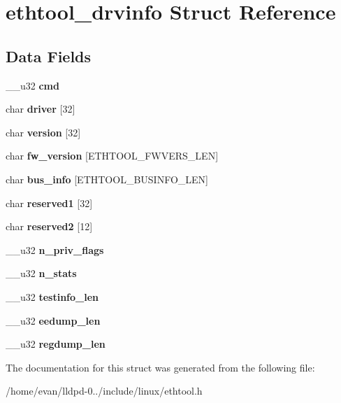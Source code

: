 \section{ethtool\-\_\-drvinfo \-Struct \-Reference}
\label{structethtool__drvinfo}
\subsection*{\-Data \-Fields}
\begin{DoxyCompactItemize}
\item 
\-\_\-\-\_\-u32 {\bfseries cmd}\label{structethtool__drvinfo_a66d231264d5aa36fd7d347e2c967769a}

\item 
char {\bfseries driver} [32]\label{structethtool__drvinfo_afac9f4c4678975b69081b0448fff5858}

\item 
char {\bfseries version} [32]\label{structethtool__drvinfo_ab7531ce77b74db0a0cd64c1ab1f69e72}

\item 
char {\bfseries fw\-\_\-version} [\-E\-T\-H\-T\-O\-O\-L\-\_\-\-F\-W\-V\-E\-R\-S\-\_\-\-L\-E\-N]\label{structethtool__drvinfo_ae49816e266953d0fcdd7bddf79d36d11}

\item 
char {\bfseries bus\-\_\-info} [\-E\-T\-H\-T\-O\-O\-L\-\_\-\-B\-U\-S\-I\-N\-F\-O\-\_\-\-L\-E\-N]\label{structethtool__drvinfo_ac8ad2ffe11406360d4cdd51c8d0f0866}

\item 
char {\bfseries reserved1} [32]\label{structethtool__drvinfo_a6070532541867232a8dfe5362db10bff}

\item 
char {\bfseries reserved2} [12]\label{structethtool__drvinfo_a605891457e400bd991877493c8ef91e6}

\item 
\-\_\-\-\_\-u32 {\bfseries n\-\_\-priv\-\_\-flags}\label{structethtool__drvinfo_a17b9813bfb728d265b50852ce4583047}

\item 
\-\_\-\-\_\-u32 {\bfseries n\-\_\-stats}\label{structethtool__drvinfo_a59d24b7bfd9278f3fc932327bd1ed832}

\item 
\-\_\-\-\_\-u32 {\bfseries testinfo\-\_\-len}\label{structethtool__drvinfo_ae22b596fb70b66919ff8f6ea6035ecd8}

\item 
\-\_\-\-\_\-u32 {\bfseries eedump\-\_\-len}\label{structethtool__drvinfo_a44b638ee0129f6376375c7cf08d38c36}

\item 
\-\_\-\-\_\-u32 {\bfseries regdump\-\_\-len}\label{structethtool__drvinfo_a070a138affdeaf43b1d074c7666eacb8}

\end{DoxyCompactItemize}


\-The documentation for this struct was generated from the following file\-:\begin{DoxyCompactItemize}
\item 
/home/evan/lldpd-\/0../include/linux/ethtool.\-h\end{DoxyCompactItemize}

